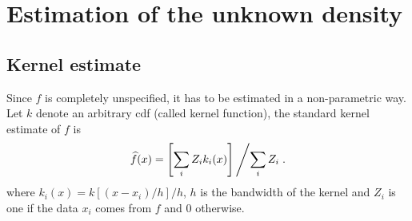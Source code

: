 \documentclass[10pt]{article}
\begin{document}
%
%
\section{Estimation of the unknown density}

\subsection{Kernel estimate}
Since $f$ is completely unspecified, it has to be estimated in a
non-parametric way. Let $k$ denote an arbitrary cdf (called kernel
function), the standard kernel estimate of $f$ is
$$
\widehat{f}(x) = \left[\sum_i Z_i k_i(x)\right] \left/ \sum_i Z_i \right..
$$
where $k_i(x) = k[(x-x_i)/h]/h$, $h$ is the bandwidth of the kernel and $Z_i$ is one if the data $x_i$ comes from $f$ and 0 otherwise.
\end{document}
